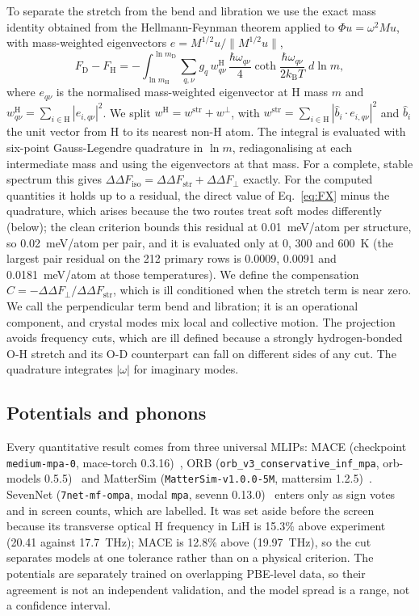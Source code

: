 \documentclass[aps,prmaterials,reprint,superscriptaddress,nofootinbib]{revtex4-2}
\newcommand{\ddF}{\Delta\Delta F_{\mathrm{iso}}}
\begin{document}
To separate the stretch from the bend and libration we use the exact mass identity obtained from the Hellmann-Feynman theorem applied to $\Phi u = \omega^2 M u$, with mass-weighted eigenvectors $e = M^{1/2}u/\lVert M^{1/2}u\rVert$,
\begin{equation}
F_{\mathrm{D}} - F_{\mathrm{H}} = -\int_{\ln m_{\mathrm{H}}}^{\ln m_{\mathrm{D}}} \sum_{q,\nu} g_q\, w^{\mathrm{H}}_{q\nu}\, \frac{\hbar\omega_{q\nu}}{4}\coth\frac{\hbar\omega_{q\nu}}{2k_{\mathrm{B}}T}\; d\ln m ,
\label{eq:massint}
\end{equation}
where $e_{q\nu}$ is the normalised mass-weighted eigenvector at H mass $m$ and $w^{\mathrm{H}}_{q\nu} = \sum_{i\in\mathrm{H}} |e_{i,q\nu}|^2$. We split $w^{\mathrm{H}} = w^{\mathrm{str}} + w^{\perp}$, with $w^{\mathrm{str}} = \sum_{i\in\mathrm{H}} |\hat b_i \cdot e_{i,q\nu}|^2$ and $\hat b_i$ the unit vector from H to its nearest non-H atom. The integral is evaluated with six-point Gauss-Legendre quadrature in $\ln m$, rediagonalising at each intermediate mass and using the eigenvectors at that mass. For a complete, stable spectrum this gives $\ddF = \Delta\Delta F_{\mathrm{str}} + \Delta\Delta F_{\perp}$ exactly. For the computed quantities it holds up to a residual, the direct value of Eq.~\eqref{eq:FX} minus the quadrature, which arises because the two routes treat soft modes differently (below); the clean criterion bounds this residual at 0.01~meV/atom per structure, so 0.02~meV/atom per pair, and it is evaluated only at 0, 300 and 600~K (the largest pair residual on the 212 primary rows is 0.0009, 0.0091 and 0.0181~meV/atom at those temperatures). We define the compensation $C = -\Delta\Delta F_{\perp}/\Delta\Delta F_{\mathrm{str}}$, which is ill conditioned when the stretch term is near zero. We call the perpendicular term bend and libration; it is an operational component, and crystal modes mix local and collective motion. The projection avoids frequency cuts, which are ill defined because a strongly hydrogen-bonded O-H stretch and its O-D counterpart can fall on different sides of any cut. The quadrature integrates $|\omega|$ for imaginary modes.

\subsection{Potentials and phonons}

Every quantitative result comes from three universal MLIPs: MACE (checkpoint \texttt{medium-mpa-0}, mace-torch 0.3.16)~\cite{Batatia2023}, ORB (\texttt{orb\_v3\_conservative\_inf\_mpa}, orb-models 0.5.5)~\cite{Rhodes2025} and MatterSim (\texttt{MatterSim-v1.0.0-5M}, mattersim 1.2.5)~\cite{Yang2024}. SevenNet (\texttt{7net-mf-ompa}, modal \texttt{mpa}, sevenn 0.13.0)~\cite{Park2024,Kim2024} enters only as sign votes and in screen counts, which are labelled. It was set aside before the screen because its transverse optical H frequency in LiH is 15.3\% above experiment (20.41 against 17.7~THz); MACE is 12.8\% above (19.97~THz), so the cut separates models at one tolerance rather than on a physical criterion. The potentials are separately trained on overlapping PBE-level data, so their agreement is not an independent validation, and the model spread is a range, not a confidence interval.
\end{document}
